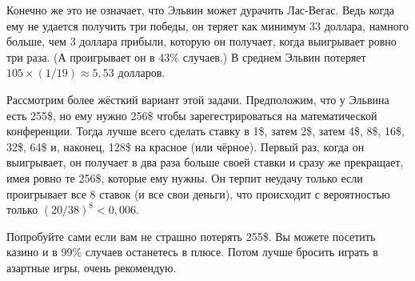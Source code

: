 Конечно же это не означает, что Эльвин может дурачить Лас-Вегас.
Ведь когда ему не удается получить три победы, он теряет как минимум 33 доллара, намного больше, чем 3 доллара прибыли, которую он получает, когда выигрывает ровно три раза.
(А проигрывает он в 43\% случаев.)
В среднем Эльвин потеряет $105 \times (1/19) \approx 5,53$ долларов.

Рассмотрим более жёсткий вариант этой задачи.
Предположим, что у Эльвина есть 255\$, но ему нужно 256\$ чтобы зарегестрироваться на математической конференции.
Тогда лучше всего сделать ставку в 1\$, затем 2\$, затем 4\$, 8\$, 16\$, 32\$, 64\$ и, наконец, 128\$ на красное (или чёрное).
Первый раз, когда он выигрывает, он получает в два раза больше своей ставки и сразу же прекращает, имея ровно те 256\$, которые ему нужны.
Он терпит неудачу только если проигрывает все 8 ставок (и все свои деньги), что происходит с вероятностью только $(20/38)^8 < 0{,}006$.

Попробуйте сами если вам не страшно потерять 255\$.
Вы можете посетить казино и в 99\% случаев останетесь в плюсе.
Потом лучше бросить играть в азартные игры, очень рекомендую.
